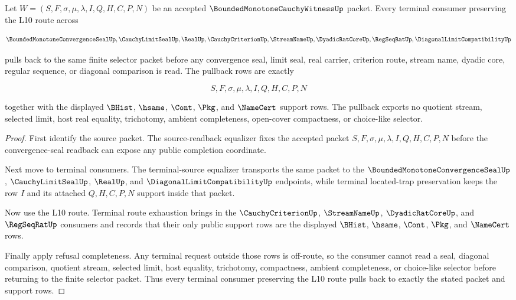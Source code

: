 \begin{theorem}
\label{thm:bounded-monotone-cauchy-witness-selector-terminal-pullback}
Let $W=(S,F,\sigma,\mu,\lambda,I,Q,H,C,P,N)$ be an accepted $\BoundedMonotoneCauchyWitnessUp$ packet. Every terminal consumer preserving the L10 route across

$$
\BoundedMonotoneConvergenceSealUp,\CauchyLimitSealUp,\RealUp,\CauchyCriterionUp,\StreamNameUp,\DyadicRatCoreUp,\RegSeqRatUp,\DiagonalLimitCompatibilityUp
$$

pulls back to the same finite selector packet before any convergence seal, limit seal, real carrier, criterion route, stream name, dyadic core, regular sequence, or diagonal comparison is read. The pullback rows are exactly

$$
S,F,\sigma,\mu,\lambda,I,Q,H,C,P,N
$$

together with the displayed $\BHist$, $\hsame$, $\Cont$, $\Pkg$, and $\NameCert$ support rows. The pullback exports no quotient stream, selected limit, host real equality, trichotomy, ambient completeness, open-cover compactness, or choice-like selector.
\end{theorem}
\begin{proof}
First identify the source packet. The source-readback equalizer fixes the accepted packet $S,F,\sigma,\mu,\lambda,I,Q,H,C,P,N$ before the convergence-seal readback can expose any public completion coordinate.

Next move to terminal consumers. The terminal-source equalizer transports the same packet to the $\BoundedMonotoneConvergenceSealUp$, $\CauchyLimitSealUp$, $\RealUp$, and $\DiagonalLimitCompatibilityUp$ endpoints, while terminal located-trap preservation keeps the row $I$ and its attached $Q,H,C,P,N$ support inside that packet.

Now use the L10 route. Terminal route exhaustion brings in the $\CauchyCriterionUp$, $\StreamNameUp$, $\DyadicRatCoreUp$, and $\RegSeqRatUp$ consumers and records that their only public support rows are the displayed $\BHist$, $\hsame$, $\Cont$, $\Pkg$, and $\NameCert$ rows.

Finally apply refusal completeness. Any terminal request outside those rows is off-route, so the consumer cannot read a seal, diagonal comparison, quotient stream, selected limit, host equality, trichotomy, compactness, ambient completeness, or choice-like selector before returning to the finite selector packet. Thus every terminal consumer preserving the L10 route pulls back to exactly the stated packet and support rows.
\end{proof}

